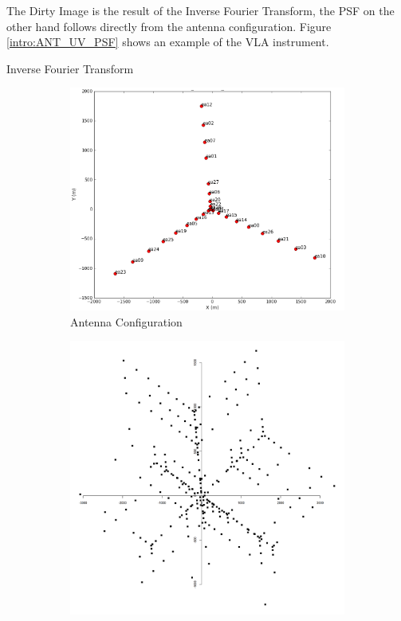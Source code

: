 The Dirty Image is the result of the Inverse Fourier Transform, the PSF on the other hand follows directly from the antenna configuration. Figure \ref{intro:ANT_UV_PSF} shows an example of the VLA instrument. 

Inverse Fourier Transform

\begin{figure}[h!]
	\centering
	\begin{subfigure}[b]{0.3\linewidth}
		 \includegraphics[width=\linewidth, trim={18px 19px 18px 18px}, clip]{./chapters/01.intro/img/antennas.png}
		 \caption{Antenna Configuration}
	\end{subfigure}
	\begin{subfigure}[b]{0.3\linewidth}
		\includegraphics[width=\linewidth, trim={18px 19px 18px 18px}, clip]{./chapters/01.intro/img/uv.png}

\end{subfigure}
\end{figure}
